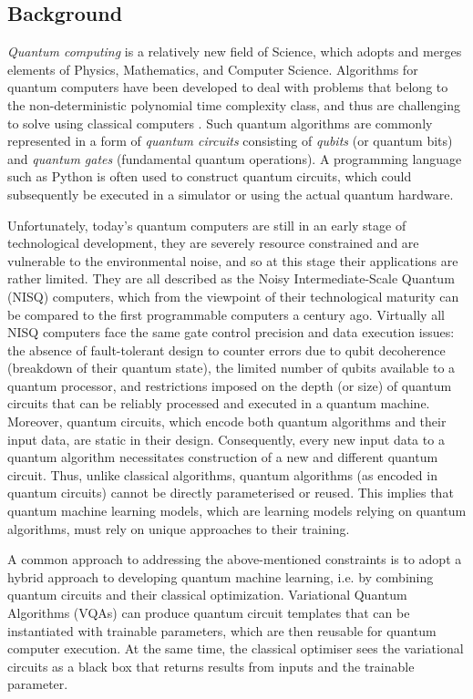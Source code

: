 \subsection{Background}\label{Background Section}
\emph{Quantum computing} is a relatively new field of Science, which adopts and merges elements of Physics, Mathematics, and Computer Science.
Algorithms for quantum computers have been developed to deal with problems that belong to the non-deterministic polynomial time complexity class, and thus are challenging to solve using classical computers \cite{williamsSolvingNPCompleteProblems2011,jiangQuantumAnnealingPrime2018,farhiQuantumApproximateOptimization2014}.
Such quantum algorithms are commonly represented in a form of \emph{quantum circuits} consisting of \emph{qubits} (or quantum bits) and \emph{quantum gates} (fundamental quantum operations). A programming language such as Python is often used to construct quantum circuits, which could subsequently be executed in a simulator or using the actual quantum hardware.


Unfortunately, today's quantum computers are still in an early stage of technological development, they are severely resource constrained and are vulnerable to the environmental noise, and so at this stage their applications are rather limited.
They are all described as the Noisy Intermediate-Scale Quantum (NISQ) \cite{brooksQuantumSupremacyHunt2019} computers, which from the viewpoint of their technological maturity can be compared to the first programmable computers a century ago.
Virtually all NISQ computers face the same gate control precision and data execution issues: the absence of fault-tolerant design to counter errors due to qubit decoherence (breakdown of their quantum state), the limited number of qubits available to a quantum processor, and restrictions imposed on the depth (or size) of quantum circuits that can be reliably processed and executed in a quantum machine.
Moreover, quantum circuits, which encode both quantum algorithms and their input data, are static in their design.
Consequently, every new input data to a quantum algorithm necessitates construction of a new and different quantum circuit.
Thus, unlike classical algorithms, quantum algorithms (as encoded in quantum circuits) cannot be directly parameterised or reused. This implies that quantum machine learning models, which are learning models relying on quantum algorithms, must rely on unique approaches to their training.

A common approach to addressing the above-mentioned constraints is to adopt a hybrid approach to developing quantum machine learning, i.e. by combining quantum circuits and their classical optimization.
Variational Quantum Algorithms (VQAs) \cite{cerezo2021variational} can produce quantum circuit templates that can be instantiated with trainable parameters, which are then reusable for quantum computer execution.
At the same time, the classical optimiser sees the variational circuits as a black box that returns results from inputs and the trainable parameter.

